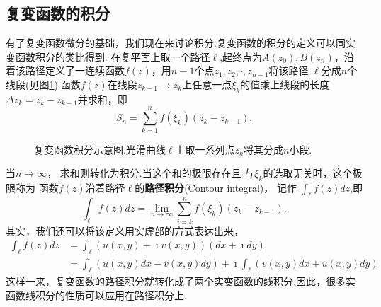 \subsection[定义和性质]{复变函数的积分}
有了复变函数微分的基础，我们现在来讨论积分.复变函数的积分的定义可以同实变函数积分的类比得到.
在复平面上取一个路径$\ell$,起终点为$A(z_0),B(z_n)$，沿着该路径定义了一连续函数$f(z)$，用$n-1$个点$z_1, z_2,\cdot, z_{n-1}$将该路径
$\ell$分成$n$个线段(见图\ref{fig:complex_integral}).函数$f(z)$在线段$z_{k-1}\rightarrow z_{k}$上任意一点$\xi_k$的值乘上线段的长度$\Delta z_k = z_k - z_{k-1}$并求和，即
\begin{equation}
    S_n = \sum_{k=1}^{n} f(\xi_k) (z_{k} - z_{k-1}) .
\end{equation}
\begin{figure}[htbp]
    \centering
    
    \caption{复变函数积分示意图.光滑曲线$\ell$上取一系列点$z_k$将其分成$n$小段.}
    \label{fig:complex_integral}
\end{figure}
当$n\to \infty$， 求和则转化为积分.当这个和的极限存在且
与$\xi_k$的选取无关时，这个极限称为
函数$f(z)$沿着路径$\ell$的\textbf{路径积分}(Contour integral)， 记作
$\int_{\ell} f(z) dz$,即
\begin{equation}
    \int_{\ell} f(z) dz = \lim_{n\to \infty} \sum_{i=k}^{n} f(\xi_k) (z_{k} - z_{k-1}) . 
\end{equation}
其实，我们还可以将该定义用实虚部的方式表达出来，
\begin{align}
    \int_{\ell} f(z) dz  & = \int_{\ell} \left( u(x,y) + \imath v(x,y) \right) (dx + \imath dy) 
    \\
    & = \int_{\ell} \left( u(x,y) dx  -  v(x,y) dy \right) + \imath \int_{\ell}  \left( v(x,y) dx  + u(x,y)dy \right) 
\end{align}
这样一来，复变函数的路径积分就转化成了两个实变函数的线积分.因此，很多实函数线积分的性质可以应用在路径积分上.


